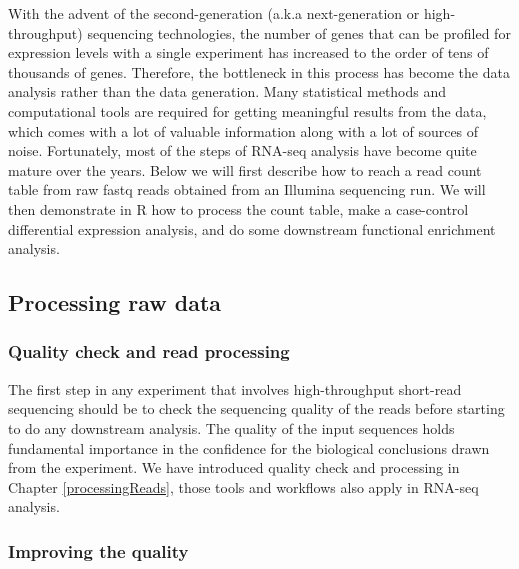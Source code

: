 \documentclass[12pt,]{krantz}
\begin{document}
With the advent of the second-generation (a.k.a next-generation or high-throughput) sequencing technologies,
the number of genes that can be profiled for expression levels with a single experiment has increased to the order of tens of thousands of genes. Therefore, the bottleneck in this process has become the data analysis rather than the data generation. Many statistical methods and computational tools are required for getting meaningful results from the data, which comes with a lot of valuable information along with a lot of sources of noise. Fortunately, most of the steps of RNA-seq analysis have become quite mature over the years. Below we will first describe how to reach a read count table from raw fastq reads obtained from an Illumina sequencing run. We will then demonstrate in R how to process the count table, make a case-control differential expression analysis, and do some downstream functional enrichment analysis.

\hypertarget{processing-raw-data}{%
\subsection{Processing raw data}\label{processing-raw-data}}

\hypertarget{quality-check-and-read-processing}{%
\subsubsection{Quality check and read processing}\label{quality-check-and-read-processing}}

The first step in any experiment that involves high-throughput short-read sequencing should be to check the sequencing quality of the reads before starting to do any downstream analysis. The quality of the input sequences holds fundamental importance in the confidence for the biological conclusions drawn from the experiment. We have introduced quality check and processing in Chapter \ref{processingReads}, those tools and workflows also apply in RNA-seq analysis.

\hypertarget{improving-the-quality}{%
\subsubsection{Improving the quality}\label{improving-the-quality}}
\end{document}
